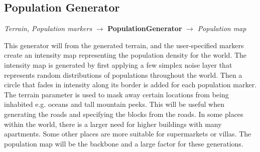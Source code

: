 \subsection{Population Generator}
\begin{center}
    \textit{Terrain, Population markers} $\rightarrow$ \textbf{PopulationGenerator} $\rightarrow$ \textit{Population map} 
\end{center}
This generator will from the generated terrain, and the user-specified markers create an intensity map representing the population density for the world.
The intensity map is generated by first applying a few simplex noise layer that represents random distributions of populations throughout the world. 
Then a circle that fades in intensity along its border is added for each population marker. 
The terrain parameter is used to mask away certain locations from being inhabited e.g. oceans and tall mountain peeks.
This will be useful when generating the roads and specifying the blocks from the roads. 
In some places within the world, there is a larger need for higher buildings with many apartments. 
Some other places are more suitable for supermarkets or villas. 
The population map will be the backbone and a large factor for these generations. 

